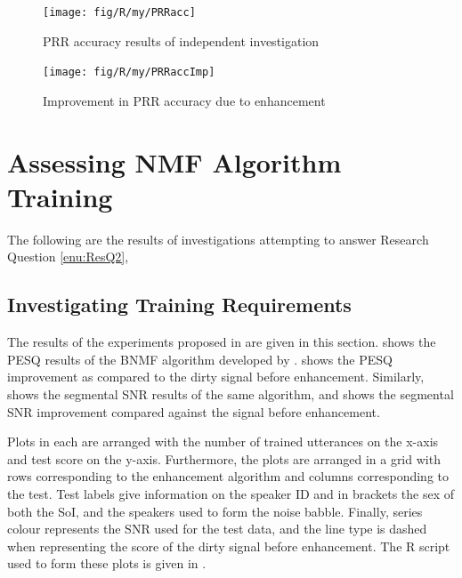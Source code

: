 \begin{figure}[h]
\noindent \begin{centering}
\texttt{[image: fig/R/my/PRRacc]}
\par\end{centering}

\protect\caption{\label{fig:my-PRRacc}\acs{PRR} accuracy results of independent investigation}
\end{figure}


\begin{figure}[h]
\noindent \begin{centering}
\texttt{[image: fig/R/my/PRRaccImp]}
\par\end{centering}

\protect\caption{\label{fig:my-PRRacc-imp}Improvement in \acs{PRR} accuracy due to
enhancement}
\end{figure}


\clearpage{}


\section{Assessing \acl{NMF} Algorithm Training}

The following are the results of investigations attempting to answer
Research Question \ref{enu:ResQ2}, \textit{\RQtwo{}}


\subsection{Investigating Training Requirements}

The results of the experiments proposed in 
are given in this section.  shows the \ac{PESQ}
results of the \ac{BNMF} algorithm developed by \citet{mohammadiha2013supervised}.
 shows the \ac{PESQ} improvement as
compared to the dirty signal before enhancement. Similarly, 
shows the segmental \ac{SNR} results of the same algorithm, and 
shows the segmental \ac{SNR} improvement compared against the signal
before enhancement.

Plots in 
each are arranged with the number of trained utterances on the x-axis
and test score on the y-axis. Furthermore, the plots are arranged
in a grid with rows corresponding to the enhancement algorithm and
columns corresponding to the test. Test labels give information on
the speaker ID and in brackets the sex of both the SoI, and the speakers
used to form the noise babble. Finally, series colour represents the
\ac{SNR} used for the test data, and the line type is dashed when
representing the score of the dirty signal before enhancement. The
R script used to form these plots is given in .

